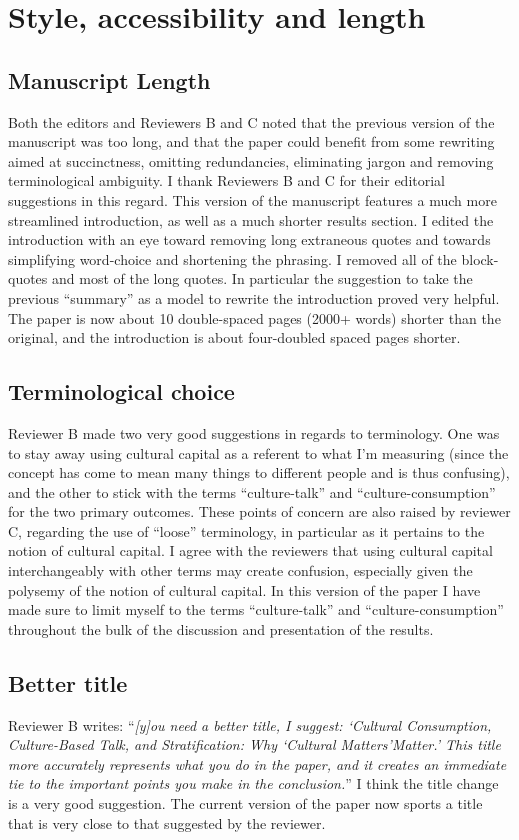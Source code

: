 \documentclass[11pt]{article}
\begin{document}
\section*{Style, accessibility and length}
\subsection*{Manuscript Length}
Both the editors and Reviewers B and C noted that the previous version of the manuscript was too long, and that the paper could benefit from some rewriting aimed at succinctness, omitting redundancies, eliminating jargon and removing terminological ambiguity.  I thank Reviewers B and C for their editorial suggestions in this regard. This version of the manuscript features a much more streamlined introduction, as well as a much shorter results section.  I edited the introduction with an eye toward removing long extraneous quotes and towards simplifying word-choice and shortening the phrasing.  I removed all of the block-quotes and most of the long quotes.  In particular the suggestion to take the previous ``summary'' as a model to rewrite the introduction proved very helpful.   The paper is now about 10 double-spaced pages (2000+ words) shorter than the original, and the introduction is about four-doubled spaced pages shorter. 

\subsection*{Terminological choice}
Reviewer B made two very good suggestions in regards to terminology.  One was to stay away using cultural capital as a referent to what I'm measuring (since the concept has come to mean many things to different people and is thus confusing), and the other to stick with the terms ``culture-talk'' and ``culture-consumption'' for the two primary outcomes.  These points of concern are also raised by reviewer C, regarding the use of ``loose'' terminology, in particular as it pertains to the notion of cultural capital.   I agree with the reviewers that using cultural capital interchangeably with other terms may create confusion, especially given the polysemy of the notion of cultural capital.  In this version of the paper I have made sure to limit myself to the terms ``culture-talk'' and ``culture-consumption'' throughout the bulk of the discussion and presentation of the results. 

\subsection*{Better title}
Reviewer B writes: ``\emph{[y]ou need a better title, I suggest: `Cultural Consumption, Culture-Based Talk, and Stratification: Why `Cultural Matters'Matter.' This title more accurately represents what you do in the paper, and it creates an immediate tie to the important points you make in the conclusion.}''  I think the title change is a very good suggestion.  The current version of the paper now sports a title that is very close to that suggested by the reviewer. 
\end{document}
